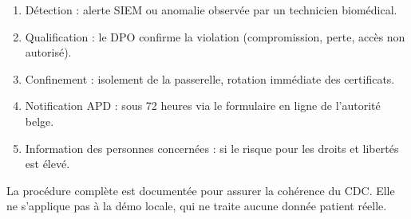 \begin{enumerate}
  \item Détection : alerte SIEM ou anomalie observée par un technicien biomédical.
  \item Qualification : le DPO confirme la violation (compromission, perte, accès non autorisé).
  \item Confinement : isolement de la passerelle, rotation immédiate des certificats.
  \item Notification APD : sous 72 heures via le formulaire en ligne de l'autorité belge.
  \item Information des personnes concernées : si le risque pour les droits et libertés est élevé.
\end{enumerate}

\begin{bridgenote}
La procédure complète est documentée pour assurer la cohérence du CDC. Elle ne s'applique pas à la démo locale, qui ne traite aucune donnée patient réelle.
\end{bridgenote}
